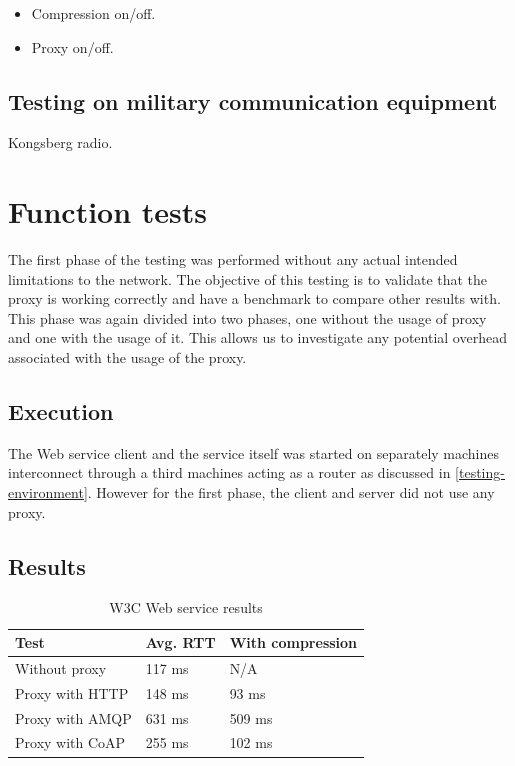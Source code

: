 \begin{itemize}
	\item Compression on/off.
	\item Proxy on/off.
\end{itemize}

\subsection{Testing on military communication equipment}
Kongsberg radio.

\section{Function tests}

The first phase of the testing was performed without any actual intended
limitations to the network. The objective of this testing is to validate that
the proxy is working correctly and have a benchmark to compare other results
with. This phase was again divided into two phases, one without the usage of
proxy and one with the usage of it. This allows us to investigate any potential
overhead associated with the usage of the proxy.

\subsection{Execution}

The Web service client and the service itself was started on separately machines
interconnect through a third machines acting as a router as discussed in
\cref{testing-environment}. However for the first phase, the client and server
did not use any proxy.


\subsection{Results}

\begin{table}[h!]
\begin{tabular}{| l | l | l |}
\hline
  \textbf{Test} & \textbf{Avg. RTT} & \textbf{With compression}\\ \hline
  Without proxy & 117 ms & N/A \\ \hline
  Proxy with HTTP & 148 ms & 93 ms \\ \hline
  Proxy with AMQP & 631 ms & 509 ms \\ \hline
  Proxy with CoAP & 255 ms & 102 ms \\ \hline
\end{tabular}
\caption{W3C Web service results}
\end{table}

